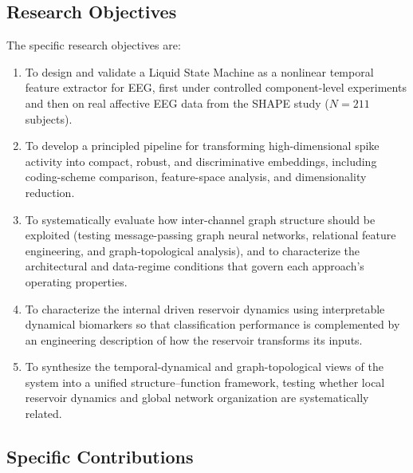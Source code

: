 \subsection{Research Objectives}

The specific research objectives are:
\begin{enumerate}
    \item To design and validate a Liquid State Machine as a nonlinear temporal feature extractor for EEG, first under controlled component-level experiments and then on real affective EEG data from the SHAPE study ($N = 211$ subjects).
    \item To develop a principled pipeline for transforming high-dimensional spike activity into compact, robust, and discriminative embeddings, including coding-scheme comparison, feature-space analysis, and dimensionality reduction.
    \item To systematically evaluate how inter-channel graph structure should be exploited (testing message-passing graph neural networks, relational feature engineering, and graph-topological analysis), and to characterize the architectural and data-regime conditions that govern each approach's operating properties.
    \item To characterize the internal driven reservoir dynamics using interpretable dynamical biomarkers so that classification performance is complemented by an engineering description of how the reservoir transforms its inputs.
    \item To synthesize the temporal-dynamical and graph-topological views of the system into a unified structure--function framework, testing whether local reservoir dynamics and global network organization are systematically related.
\end{enumerate}

\subsection{Specific Contributions}

